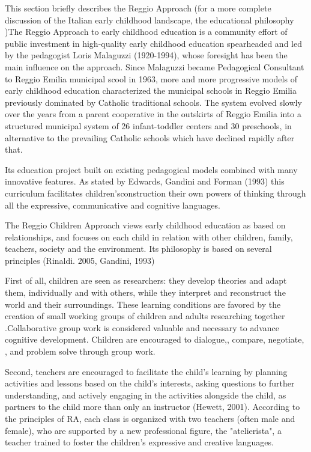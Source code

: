 \documentclass[12pt]{article}
\begin{document}
This section briefly describes the Reggio Approach (for a more complete
discussion of the Italian early childhood landscape, the educational
philosophy \citet{biroli2015evaluating})The Reggio Approach to early
childhood education is a community effort of public investment in
high-quality early childhood education spearheaded and led by the pedagogist
Loris Malaguzzi (1920-1994), whose foresight has been the main influence on
the approach. Since Malaguzzi became Pedagogical Consultant to Reggio Emilia
municipal scool in 1963, more and more progressive models of early childhood
education characterized the municipal schools in Reggio Emilia previously
dominated by Catholic traditional schools. The system evolved slowly over
the years from a parent cooperative in the outskirts of Reggio Emilia into a
structured municipal system of 26 infant-toddler centers and 30 preschools,
in alternative to the prevailing Catholic schools which have declined
rapidly after that.

Its education project built on existing pedagogical models combined with
many innovative features. As stated by Edwards, Gandini and Forman (1993)
this curriculum facilitates children'sconstruction their own powers of
thinking through all the expressive, communicative and cognitive languages.

The Reggio Children Approach views early childhood education as based on
relationships, and focuses on each child in relation with other children,
family, teachers, society and the environment. Its philosophy is based on
several principles (Rinaldi. 2005, Gandini, 1993)

First of all, children are seen as researchers: they develop theories and
adapt them, individually and with others, while they interpret and
reconstruct the world and their surroundings. These learning conditions are
favored by the creation of small working groups of children and adults
researching together .Collaborative group work is considered valuable and
necessary to advance cognitive development. Children are encouraged to
dialogue,, compare, negotiate, , and problem solve through group work.

Second, teachers are encouraged to facilitate the child's learning by
planning activities and lessons based on the child's interests, asking
questions to further understanding, and actively engaging in the activities
alongside the child, as partners to the child more than only an instructor
(Hewett, 2001). According to the principles of RA, each class is organized
with two teachers (often male and female), who are supported by a new
professional figure, the "atelierista", a teacher trained to foster the
children's expressive and creative languages.
\end{document}
